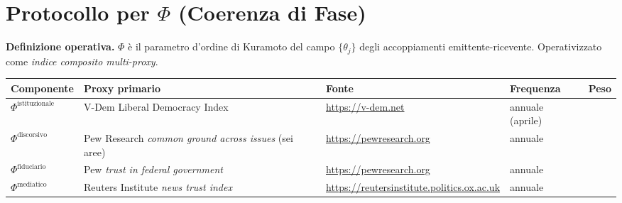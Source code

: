 \section{\texorpdfstring{Protocollo per \(\Phi\) (Coerenza di
Fase)}{Protocollo per \textbackslash Phi (Coerenza di Fase)}}\label{protocollo-per-phi-coerenza-di-fase}

\Hypoth{} \textbf{Definizione operativa.} \(\Phi\) è il parametro
d'ordine di Kuramoto del campo \(\{\theta_j\}\) degli accoppiamenti
emittente-ricevente. Operativizzato come \emph{indice composito
multi-proxy}.

{\def\LTcaptype{none} %
{\small\begin{longtable}[]{@{}
  >{\raggedright\arraybackslash}p{}
  >{\raggedright\arraybackslash}p{}
  >{\raggedright\arraybackslash}p{}
  >{\raggedright\arraybackslash}p{}
  >{\raggedright\arraybackslash}p{}@{}}
\toprule\noalign{}
\begin{minipage}[b]{\linewidth}\raggedright
Componente
\end{minipage} & \begin{minipage}[b]{\linewidth}\raggedright
Proxy primario
\end{minipage} & \begin{minipage}[b]{\linewidth}\raggedright
Fonte
\end{minipage} & \begin{minipage}[b]{\linewidth}\raggedright
Frequenza
\end{minipage} & \begin{minipage}[b]{\linewidth}\raggedright
Peso
\end{minipage} \\
\midrule\noalign{}
\endhead
\bottomrule\noalign{}
\endlastfoot
\(\Phi^{\text{istituzionale}}\) & V-Dem Liberal Democracy Index &
\url{https://v-dem.net} & annuale (aprile) & 0.40 \\
\(\Phi^{\text{discorsivo}}\) & Pew Research \emph{common ground across
issues} (sei aree) & \url{https://pewresearch.org} & annuale & 0.25 \\
\(\Phi^{\text{fiduciario}}\) & Pew \emph{trust in federal government} &
\url{https://pewresearch.org} & annuale & 0.20 \\
\(\Phi^{\text{mediatico}}\) & Reuters Institute \emph{news trust index}
& \url{https://reutersinstitute.politics.ox.ac.uk} & annuale & 0.15 \\
\end{longtable}}
}

